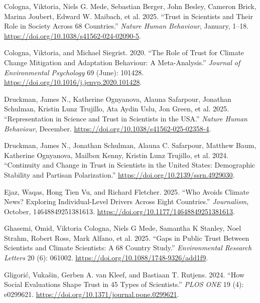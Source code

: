 \documentclass[
  letterpaper,
  DIV=11,
  numbers=noendperiod]{scrartcl}
\newlength{\cslhangindent}
\newenvironment{CSLReferences}[2] %
 {\begin{list}{}{%
  \setlength{\itemindent}{0pt}
  \setlength{\leftmargin}{0pt}
  \setlength{\parsep}{0pt}
  \ifodd #1
   \setlength{\leftmargin}{\cslhangindent}
   \setlength{\itemindent}{-1\cslhangindent}
  \fi
  \setlength{\itemsep}{#2\baselineskip}}}
 {\end{list}}
\begin{document}
\begin{CSLReferences}{1}{0}
Cologna, Viktoria, Niels G. Mede, Sebastian Berger, John Besley, Cameron
Brick, Marina Joubert, Edward W. Maibach, et al. 2025. {``Trust in
Scientists and Their Role in Society Across 68 Countries.''}
\emph{Nature Human Behaviour}, January, 1--18.
\url{https://doi.org/10.1038/s41562-024-02090-5}.

Cologna, Viktoria, and Michael Siegrist. 2020. {``The Role of Trust for
Climate Change Mitigation and Adaptation Behaviour: A Meta-Analysis.''}
\emph{Journal of Environmental Psychology} 69 (June): 101428.
\url{https://doi.org/10.1016/j.jenvp.2020.101428}.

Druckman, James N., Katherine Ognyanova, Alauna Safarpour, Jonathan
Schulman, Kristin Lunz Trujillo, Ata Aydin Uslu, Jon Green, et al. 2025.
{``Representation in Science and Trust in Scientists in the USA.''}
\emph{Nature Human Behaviour}, December.
\url{https://doi.org/10.1038/s41562-025-02358-4}.

Druckman, James N., Jonathan Schulman, Alauna C. Safarpour, Matthew
Baum, Katherine Ognyanova, Mailbox Kenny, Kristin Lunz Trujillo, et al.
2024. {``Continuity and Change in Trust in Scientists in the United
States: Demographic Stability and Partisan Polarization.''}
\url{https://doi.org/10.2139/ssrn.4929030}.

Ejaz, Waqas, Hong Tien Vu, and Richard Fletcher. 2025. {``Who Avoids
Climate News? Exploring Individual-Level Drivers Across Eight
Countries.''} \emph{Journalism}, October, 14648849251381613.
\url{https://doi.org/10.1177/14648849251381613}.

Ghasemi, Omid, Viktoria Cologna, Niels G Mede, Samantha K Stanley, Noel
Strahm, Robert Ross, Mark Alfano, et al. 2025. {``Gaps in Public Trust
Between Scientists and Climate Scientists: A 68 Country Study.''}
\emph{Environmental Research Letters} 20 (6): 061002.
\url{https://doi.org/10.1088/1748-9326/add1f9}.

Gligorić, Vukašin, Gerben A. van Kleef, and Bastiaan T. Rutjens. 2024.
{``How Social Evaluations Shape Trust in 45 Types of Scientists.''}
\emph{PLOS ONE} 19 (4): e0299621.
\url{https://doi.org/10.1371/journal.pone.0299621}.


\end{CSLReferences}
\end{document}
